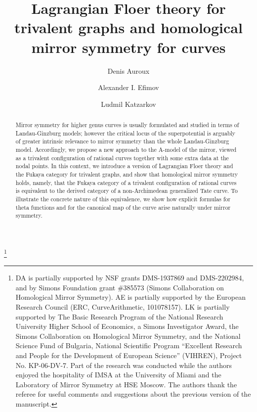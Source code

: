 \documentclass[11pt,leqno]{amsart}
\title[Lagrangian Floer theory for trivalent graphs and HMS for curves]
{Lagrangian Floer theory for trivalent graphs
and homological mirror symmetry for curves}
\author{Denis Auroux}
\author{Alexander I. Efimov}
\author{Ludmil Katzarkov}
\renewcommand{\baselinestretch}{1.3}
\numberwithin{equation}{section}
\begin{document}
\begin{abstract}
Mirror symmetry for higher genus curves is usually formulated and studied
in terms of Landau-Ginzburg models; however the critical locus of the
superpotential is arguably of greater intrinsic relevance to 
mirror symmetry than the whole
Landau-Ginzburg model.
Accordingly, we propose a new approach to the A-model of the mirror, 
viewed as a trivalent configuration of rational curves together
with some extra data at the nodal points. In this context, we introduce
a version of Lagrangian Floer theory and the Fukaya category for trivalent
graphs, and show that homological mirror symmetry holds,
namely, that the Fukaya category of a trivalent configuration of rational
curves is equivalent to the derived category of a non-Archimedean
generalized Tate curve. To illustrate the concrete nature of this
equivalence, we show how explicit formulas for theta functions 
and for the canonical map of the curve arise naturally under mirror symmetry.
\end{abstract}

\thanks{
DA is partially supported by NSF grants DMS-1937869 and DMS-2202984, and by Simons Foundation grant
\#385573 (Simons Collaboration on Homological Mirror Symmetry).
AE is partially supported by the European Research Council (ERC, CurveArithmetic, 101078157).
LK is partially supported by The Basic Research Program of the National Research
University Higher School of Economics, a Simons Investigator Award,
the Simons Collaboration on Homological Mirror Symmetry, and the
National Science Fund of Bulgaria, National Scientific Program ``Excellent Research and
People for the Development of European Science'' (VIHREN), Project No. KP-06-DV-7.
Part of the research was
conducted while the authors enjoyed the hospitality of IMSA at the University of Miami and the
Laboratory of Mirror Symmetry at HSE Moscow.
The authors thank the referee for useful comments and suggestions about the
previous version of the manuscript.
}

\renewcommand{\baselinestretch}{1.1}

\maketitle
\setcounter{tocdepth}{1}
\tableofcontents

\vfil

\renewcommand{\baselinestretch}{1.3}
\end{document}
